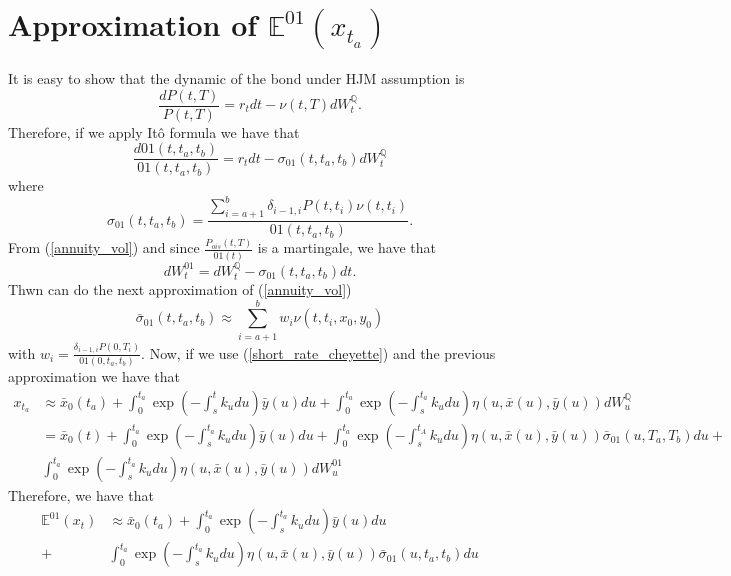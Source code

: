 \documentclass[a4paper,10pt]{article}
\newcommand{\1}{\mathbf{1}}
\begin{document}
\section{Approximation of $\mathbb{E}^{01}\left(x_{t_a}\right)$}
It is easy to show that the dynamic of the bond under HJM assumption is
\begin{equation}
\frac{dP(t,T)}{P(t,T)} = r_t dt - \nu(t,T)dW^{\mathbb{Q}}_t.  
\end{equation}
Therefore, if we apply Itô formula we have that 
\begin{equation}\label{annuity_spot_dynamic}
\frac{d01(t,t_a,t_b)}{01(t,t_a,t_b)} = r_t dt - \sigma_{01}(t,t_a,t_b)dW^{\mathbb{Q}}_t
\end{equation}
where 
\begin{equation} \label{annuity_vol}
\sigma_{01}(t,t_a,t_b) = \frac{\sum_{i=a+1}^{b} \delta_{i-1,i} P(t,t_i) \nu(t,t_i)}{01(t,t_a,t_b)}.
\end{equation}
From (\ref{annuity_vol}) and since $\frac{P_{ois}(t,T)}{01(t)}$ is a martingale, we have that
\begin{equation*}
dW^{01}_t = dW^{\mathbb{Q}}_t - \sigma_{01}(t,t_a,t_b)dt. 
\end{equation*}
Thwn can do the next approximation of (\ref{annuity_vol})
\begin{equation} \label{approximation_o1_vol}
\bar{\sigma}_{01}(t,t_a,t_b) \approx \sum_{i=a+1}^{b} w_i \nu(t,t_i,x_0,y_0)
\end{equation}
with $w_i=\frac{\delta_{i-1,i} P(0,T_i)}{01(0,t_a,t_b)}$. Now, if we use (\ref{short_rate_cheyette}) and the previous approximation we have that
\begin{align}
x_{t_a} &\approx \bar{x}_0(t_a)  + \int_{0}^{t_a} \exp\left(-\int_{s}^{t}k_u du\right) \bar{y}(u) du + \int_{0}^{t_a}  \exp\left(-\int_{s}^{t_a}k_u du \right) \eta(u,\bar{x}(u),\bar{y}(u)) dW_u^{\mathbb{Q}} \nonumber \\
&=  \bar{x}_0(t)  + \int_{0}^{t_a} \exp\left(-\int_{s}^{t_a}k_u du\right) \bar{y}(u) du + \int_{0}^{t_a} \exp\left(-\int_{s}^{t_A}k_u du \right) \eta(u,\bar{x}(u),\bar{y}(u)) \bar{\sigma}_{01}(u, T_a, T_b) du  + \nonumber \\ 
& \int_{0}^{t_a} \exp\left(-\int_{s}^{t_a}k_u du \right) \eta(u,\bar{x}(u),\bar{y}(u)) dW_u^{01} 
\end{align}
Therefore, we have that
\begin{align}
\mathbb{E}^{01}\left(x_t\right) &\approx \bar{x}_0(t_a)  + \int_{0}^{t_a} \exp\left(-\int_{s}^{t_a}k_u du\right) \bar{y}(u) du \nonumber \\ 
+ &\int_{0}^{t_a} \exp\left(-\int_{s}^{t_a}k_u du \right) \eta(u,\bar{x}(u),\bar{y}(u)) \bar{\sigma}_{01}(u, t_a, t_b) du
\end{align}
\end{document}
